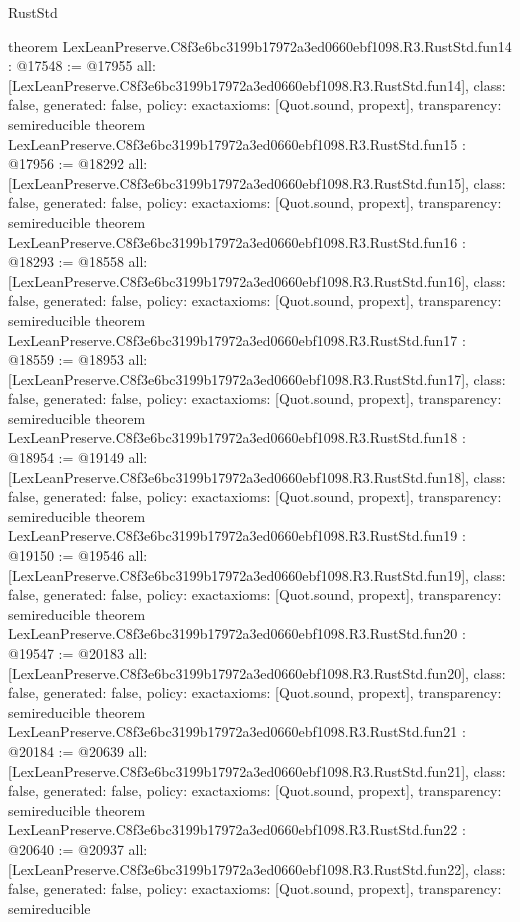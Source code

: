 \begin{lexlean}{RustStd}
\begin{coremodule}
{}
theorem LexLeanPreserve.C8f3e6bc3199b17972a3ed0660ebf1098.R3.RustStd.fun14 : @17548 := @17955 {
  all: [LexLeanPreserve.C8f3e6bc3199b17972a3ed0660ebf1098.R3.RustStd.fun14],
  class: false,
  generated: false,
  policy: exact{axioms: [Quot.sound, propext]},
  transparency: semireducible
}
theorem LexLeanPreserve.C8f3e6bc3199b17972a3ed0660ebf1098.R3.RustStd.fun15 : @17956 := @18292 {
  all: [LexLeanPreserve.C8f3e6bc3199b17972a3ed0660ebf1098.R3.RustStd.fun15],
  class: false,
  generated: false,
  policy: exact{axioms: [Quot.sound, propext]},
  transparency: semireducible
}
theorem LexLeanPreserve.C8f3e6bc3199b17972a3ed0660ebf1098.R3.RustStd.fun16 : @18293 := @18558 {
  all: [LexLeanPreserve.C8f3e6bc3199b17972a3ed0660ebf1098.R3.RustStd.fun16],
  class: false,
  generated: false,
  policy: exact{axioms: [Quot.sound, propext]},
  transparency: semireducible
}
theorem LexLeanPreserve.C8f3e6bc3199b17972a3ed0660ebf1098.R3.RustStd.fun17 : @18559 := @18953 {
  all: [LexLeanPreserve.C8f3e6bc3199b17972a3ed0660ebf1098.R3.RustStd.fun17],
  class: false,
  generated: false,
  policy: exact{axioms: [Quot.sound, propext]},
  transparency: semireducible
}
theorem LexLeanPreserve.C8f3e6bc3199b17972a3ed0660ebf1098.R3.RustStd.fun18 : @18954 := @19149 {
  all: [LexLeanPreserve.C8f3e6bc3199b17972a3ed0660ebf1098.R3.RustStd.fun18],
  class: false,
  generated: false,
  policy: exact{axioms: [Quot.sound, propext]},
  transparency: semireducible
}
theorem LexLeanPreserve.C8f3e6bc3199b17972a3ed0660ebf1098.R3.RustStd.fun19 : @19150 := @19546 {
  all: [LexLeanPreserve.C8f3e6bc3199b17972a3ed0660ebf1098.R3.RustStd.fun19],
  class: false,
  generated: false,
  policy: exact{axioms: [Quot.sound, propext]},
  transparency: semireducible
}
theorem LexLeanPreserve.C8f3e6bc3199b17972a3ed0660ebf1098.R3.RustStd.fun20 : @19547 := @20183 {
  all: [LexLeanPreserve.C8f3e6bc3199b17972a3ed0660ebf1098.R3.RustStd.fun20],
  class: false,
  generated: false,
  policy: exact{axioms: [Quot.sound, propext]},
  transparency: semireducible
}
theorem LexLeanPreserve.C8f3e6bc3199b17972a3ed0660ebf1098.R3.RustStd.fun21 : @20184 := @20639 {
  all: [LexLeanPreserve.C8f3e6bc3199b17972a3ed0660ebf1098.R3.RustStd.fun21],
  class: false,
  generated: false,
  policy: exact{axioms: [Quot.sound, propext]},
  transparency: semireducible
}
theorem LexLeanPreserve.C8f3e6bc3199b17972a3ed0660ebf1098.R3.RustStd.fun22 : @20640 := @20937 {
  all: [LexLeanPreserve.C8f3e6bc3199b17972a3ed0660ebf1098.R3.RustStd.fun22],
  class: false,
  generated: false,
  policy: exact{axioms: [Quot.sound, propext]},
  transparency: semireducible
}
\end{coremodule}
\end{lexlean}
